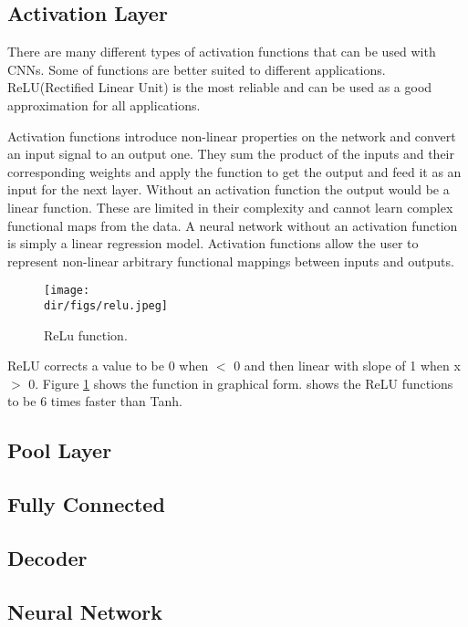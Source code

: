 \subsection{Activation Layer}
There are many different types of activation functions that can be used with CNNs. Some of functions are better suited to different applications. ReLU(Rectified Linear Unit) is the most reliable and can be used as a good approximation for all applications. \par
Activation functions introduce non-linear properties on the network and convert an input signal to an output one. They sum the product of the inputs and their corresponding weights and apply the function to get the output and feed it as an input for the next layer. Without an activation function the output would be a linear function. These are limited in their complexity and cannot learn complex functional maps from the data. A neural network without an activation function is simply a linear regression model. Activation functions allow the user to represent non-linear arbitrary functional mappings between inputs and outputs. \par
\begin{figure}[H]
    \centering
    \texttt{[image: \\dir/figs/relu.jpeg]}
    \caption{ReLu function.}
    \label{fig.relu}
\end{figure}
ReLU corrects a value to be 0 when $<$ 0 and then linear with slope of 1 when x $>$ 0. Figure \ref{fig.relu} shows the function in graphical form. \citet{krizhevsky17} shows the ReLU functions to be 6 times faster than Tanh. 
\subsection{Pool Layer}

\subsection{Fully Connected}

\subsection{Decoder}

\subsection{Neural Network}
